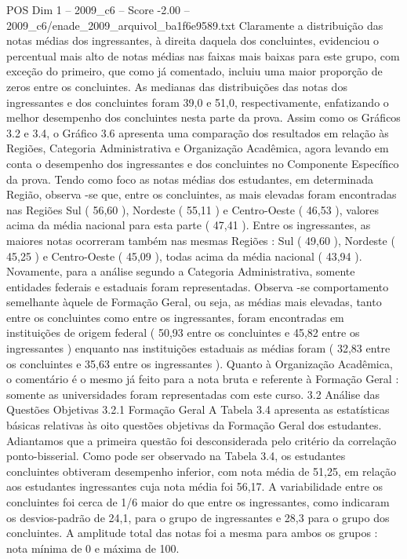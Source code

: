 \begin{textsample}{POS Dim 1 – 2009\_c6 – Score -2.00 – 2009\_c6/enade\_2009\_arquivol\_ba1f6e9589.txt}
Claramente a distribuição das notas médias dos ingressantes, à direita daquela dos concluintes, evidenciou o percentual mais alto de notas médias nas faixas mais baixas para este grupo, com exceção do primeiro, que como já comentado, incluiu uma maior proporção de zeros entre os concluintes.
As medianas das distribuições das notas dos ingressantes e dos concluintes foram 39,0 e 51,0, respectivamente, enfatizando o melhor desempenho dos concluintes nesta parte da prova.
Assim como os Gráficos 3.2 e 3.4, o Gráfico 3.6 apresenta uma comparação dos resultados em relação às Regiões, Categoria Administrativa e Organização Acadêmica, agora levando em conta o desempenho dos ingressantes e dos concluintes no Componente Específico da prova.
Tendo como foco as notas médias dos estudantes, em determinada Região, observa -se que, entre os concluintes, as mais elevadas foram encontradas nas Regiões Sul ( 56,60 ), Nordeste ( 55,11 ) e Centro-Oeste ( 46,53 ), valores acima da média nacional para esta parte ( 47,41 ).
Entre os ingressantes, as maiores notas ocorreram também nas mesmas Regiões : Sul ( 49,60 ), Nordeste ( 45,25 ) e Centro-Oeste ( 45,09 ), todas acima da média nacional ( 43,94 ).
Novamente, para a análise segundo a Categoria Administrativa, somente entidades federais e estaduais foram representadas.
Observa -se comportamento semelhante àquele de Formação Geral, ou seja, as médias mais elevadas, tanto entre os concluintes como entre os ingressantes, foram encontradas em instituições de origem federal ( 50,93 entre os concluintes e 45,82 entre os ingressantes ) enquanto nas instituições estaduais as médias foram ( 32,83 entre os concluintes e 35,63 entre os ingressantes ).
Quanto à Organização Acadêmica, o comentário é o mesmo já feito para a nota bruta e referente à Formação Geral : somente as universidades foram representadas com este curso. 3.2 Análise das Questões Objetivas 3.2.1 Formação Geral A Tabela 3.4 apresenta as estatísticas básicas relativas às oito questões objetivas da Formação Geral dos estudantes.
Adiantamos que a primeira questão foi desconsiderada pelo critério da correlação ponto-bisserial.
Como pode ser observado na Tabela 3.4, os estudantes concluintes obtiveram desempenho inferior, com nota média de 51,25, em relação aos estudantes ingressantes cuja nota média foi 56,17.
A variabilidade entre os concluintes foi cerca de 1/6 maior do que entre os ingressantes, como indicaram os desvios-padrão de 24,1, para o grupo de ingressantes e 28,3 para o grupo dos concluintes.
A amplitude total das notas foi a mesma para ambos os grupos : nota mínima de 0 e máxima de 100.

\end{textsample}
